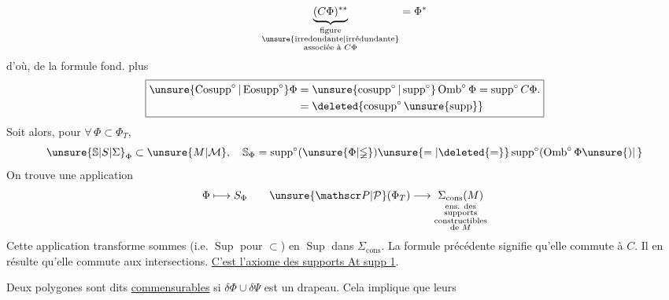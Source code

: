 
\[
\underbrace{(C\Phi)^{**}}_{\substack{\text{figure}\\\text{\unsure{irredondante|irrédundante}}\\\text{associée à }C\Phi}}=\Phi^*
\]
d'où,  de la formule fond. plus 
\[
\boxed{\begin{aligned}
\unsure{\operatorname{Cosupp}^{\circ}|\operatorname{Eosupp}^{\circ}}\Phi&=\unsure{\operatorname{cosupp}^{\circ}|\operatorname{supp}^{\circ}}\operatorname{Omb}^{\circ}\Phi=\operatorname{supp}^{\circ}C\Phi.\\
&=\deleted{\operatorname{cosupp}^{\circ}\unsure{\operatorname{supp}}}
\end{aligned}}
\]
Soit alors, pour $\forall\,\Phi\subset\Phi_T$,
\[
\unsure{\mathbb{S}|S|\Sigma}_{\Phi}\subset\unsure{M|\mathcal M},\quad\mathbb{S}_{\Phi}=\operatorname{supp}^{\circ}(\unsure{\Phi|\mathbb{\Phi}})\unsure{=|\deleted{=}}\operatorname{supp}^{\circ}(\operatorname{Omb}^{\circ}\Phi\unsure{)|\,}
\]
On trouve une application
\[
\Phi\longmapsto S_{\Phi}\qquad\unsure{\mathscr P|\mathcal P}(\Phi_T)\longrightarrow\underset{\substack{\text{ens. des}\\\text{supports}\\\text{constructibles}\\\text{de }M}}{\Sigma_{\mathrm{cons}}(M)}
\]
Cette application transforme  sommes (i.e. $\operatorname{Sup}$ pour $\subset$) en $\operatorname{Sup}$ dans $\Sigma_{\mathrm{cons}}$. La formule précédente signifie qu'elle commute à $C$. Il en résulte qu'elle commute aux intersections. \uline{C'est l'axiome des supports At supp 1}.

Deux  polygones \inserted{$\Phi,\Psi$} sont dits \uline{commensurables} si $\delta\Phi\cup\delta\Psi$ est un drapeau. Cela  implique que leurs
